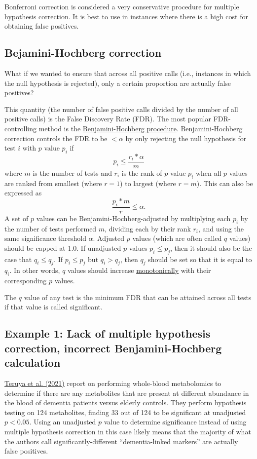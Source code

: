 \documentclass[letterpaper, 12pt]{article}
\begin{document}
Bonferroni correction is considered a very conservative procedure for multiple hypothesis correction. It is best to use in instances where there is a high cost for obtaining false positives.

\subsection*{Bejamini-Hochberg correction}

What if we wanted to ensure that across all positive calls (i.e., instances in which the null hypothesis is rejected), only a certain proportion are actually false positives?

This quantity (the number of false positive calls divided by the number of all positive calls) is the False Discovery Rate (FDR). The most popular FDR-controlling method is the \href{https://doi.org/10.1111/j.2517-6161.1995.tb02031.x}{Benjamini-Hochberg procedure}. Benjamini-Hochberg correction controls the FDR to be $< \alpha$ by only rejecting the null hypothesis for test $i$ with $p$ value $p_i$ if
$$p_i \leq \frac{r_i * \alpha}{m}$$
where $m$ is the number of tests and $r_i$ is the rank of $p$ value $p_i$ when all $p$ values are ranked from smallest (where $r = 1$) to largest (where $r = m$). This can also be expressed as
$$\frac{p_i * m}{r} \leq \alpha.$$
A set of $p$ values can be Benjamini-Hochberg-adjusted by multiplying each $p_i$ by the number of tests performed $m$, dividing each by their rank $r_i$, and using the same significance threshold $\alpha$. Adjusted $p$ values (which are often called $q$ values) should be capped at 1.0. If unadjusted $p$ values $p_i \leq p_j$, then it should also be the case that $q_i \leq q_j$. If $p_i \leq p_j$ but $q_i > q_j$, then $q_j$ should be set so that it is equal to $q_i$. In other words, $q$ values should increase \href{https://en.wikipedia.org/wiki/Monotonic_function}{monotonically} with their corresponding $p$ values.

The $q$ value of any test is the minimum FDR that can be attained across all tests if that value is called significant.

\subsection*{Example 1: Lack of multiple hypothesis correction, incorrect Benjamini-Hochberg calculation}

\href{https://doi.org/10.1073/pnas.2022857118}{Teruya et al. (2021)} report on performing whole-blood metabolomics to determine if there are any metabolites that are present at different abundance in the blood of dementia patients versus elderly controls. They perform hypothesis testing on 124 metabolites, finding 33 out of 124 to be significant at unadjusted $p < 0.05$. Using an unadjusted $p$ value to determine significance instead of using multiple hypothesis correction in this case likely means that the majority of what the authors call significantly-different ``dementia-linked markers'' are actually false positives.
\end{document}
